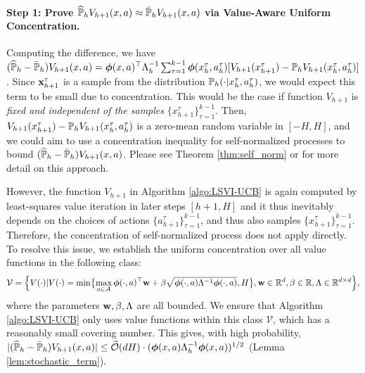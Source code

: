 \paragraph{Step 1: Prove $\hat{\P}_h V_{h+1}(x, a) \approx \bar{\P}_h V_{h+1}(x, a)$ via  Value-Aware Uniform Concentration.} Computing the difference, we have $(\hat{\P}_h - \bar{\P}_h)V_{h+1}(x, a) 
= \bphi(x, a)\trans\Lambda_h^{-1} \sum_{\tau=1}^{k-1} \bphi(x^{\tau}_h,  a^{\tau}_h) [V_{h+1}(x^\tau_{h+1}) - \P_h V_{h+1}(x^{\tau}_h,  a^{\tau}_h)]$. Since $\x^\tau_{h+1}$ is a sample from the distribution $\P_h(\cdot|x^{\tau}_h,  a^{\tau}_h)$, we would expect this term to be small due to concentration. This would be the case if function $V_{h+1}$ is \emph{fixed and independent of the samples} $\{x^\tau_{h+1}\}_{\tau=1}^{k-1}$. Then, $V_{h+1}(x^\tau_{h+1}) - \P_h V_{h+1}(x^{\tau}_h,  a^{\tau}_h)$ is a zero-mean random variable in $[-H, H]$, and we could aim to use a concentration inequality for self-normalized processes to bound $(\hat{\P}_h - \bar{\P}_h)V_{h+1}(x, a)$. Please see Theorem \ref{thm:self_norm} or \cite{abbasi2011improved} for more detail on this approach.

However, the function $V_{h+1}$ in Algorithm \ref{algo:LSVI-UCB} is again computed by least-squares value iteration in later steps $[h+1, H]$ and it thus inevitably depends on the choices of actions $\{a^\tau_{h+1}\}_{\tau=1}^{k-1}$, and thus also samples $\{x^\tau_{h+1}\}_{\tau=1}^{k-1}$. Therefore, the concentration of self-normalized process does not apply directly. To resolve this issue, we establish the uniform concentration over all value functions in the following class:
\begin{equation}\label{eq:class_value}
\mathcal{V} = \Big \{ V(\cdot ) | V(\cdot ) = \min \bigl  \{ \max_{a \in \cA} \bphi (\cdot, a)  ^\top  \w + \beta \sqrt{\bphi (\cdot, a) \Lambda^{-1} \bphi (\cdot, a)}, H\bigr \}, \w \in \R^d, \beta \in \R, \Lambda \in \R^{d\times d} \Bigr \},
\end{equation}
where the parameters $\w, \beta, \Lambda$ are all bounded. We ensure that Algorithm \ref{algo:LSVI-UCB} only uses value functions within this class $\mathcal{V}$, which has a reasonably small covering number. This gives, with high probability, $|(\hat{\P}_h - \bar{\P}_h)V_{h+1}(x, a)| \le \tilde{\cO}(dH)\cdot(\bphi(x, a) \Lambda^{-1}_h \bphi(x, a))^{1/2}$  (Lemma \ref{lem:stochastic_term}). 


